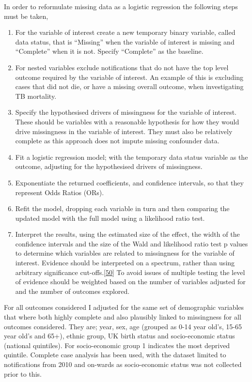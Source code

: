 \documentclass[11pt,twoside]{bristolthesis}
\begin{document}
  In order to reformulate missing data as a logistic regression the following steps must be taken,
  \begin{enumerate}
  \def\labelenumi{\arabic{enumi}.}
  \item
    For the variable of interest create a new temporary binary variable, called data status, that is ``Missing'' when the variable of interest is missing and ``Complete'' when it is not. Specify ``Complete'' as the baseline.
  \item
    For nested variables exclude notifications that do not have the top level outcome required by the variable of interest. An example of this is excluding cases that did not die, or have a missing overall outcome, when investigating TB mortality.
  \item
    Specify the hypothesised drivers of missingness for the variable of interest. These should be variables with a reasonable hypothesis for how they would drive missingness in the variable of interest. They must also be relatively complete as this approach does not impute missing confounder data.
  \item
    Fit a logistic regression model; with the temporary data status variable as the outcome, adjusting for the hypothesised drivers of missingness.
  \item
    Exponentiate the returned coefficients, and confidence intervals, so that they represent Odds Ratios (ORs).
  \item
    Refit the model, dropping each variable in turn and then comparing the updated model with the full model using a likelihood ratio test.
  \item
    Interpret the results, using the estimated size of the effect, the width of the confidence intervals and the size of the Wald and likelihood ratio test p values to determine which variables are related to missingness for the variable of interest. Evidence should be interpreted on a spectrum, rather than using arbitrary significance cut-offs.{[}\protect\hyperlink{ref-Sterne2001}{50}{]} To avoid issues of multiple testing the level of evidence should be weighted based on the number of variables adjusted for and the number of outcomes explored.
  \end{enumerate}
  For all outcomes considered I adjusted for the same set of demographic variables that where both highly complete and also plausibly linked to missingness for all outcomes considered. They are; year, sex, age (grouped as 0-14 year old's, 15-65 year old's and 65+), ethnic group, UK birth status and socio-economic status (national quintiles). For socio-economic group 1 indicates the most deprived quintile. Complete case analysis has been used, with the dataset limited to notifications from 2010 and on-wards as socio-economic status was not collected prior to this.
  
\end{document}
